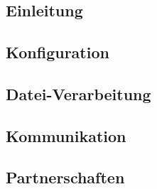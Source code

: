 \chapter{\sblitg}
\renewcommand{\kapitelautor}{Autor: Nikola Szucsich}

\section{Einleitung} \label{Einleitung}


\section{Konfiguration} \label{Konfiguration}


\section{Datei-Verarbeitung} \label{Dateiverarbeitung}


\section{Kommunikation} \label{Kommunikation}


\section{Partnerschaften} \label{Partnerschaften}

